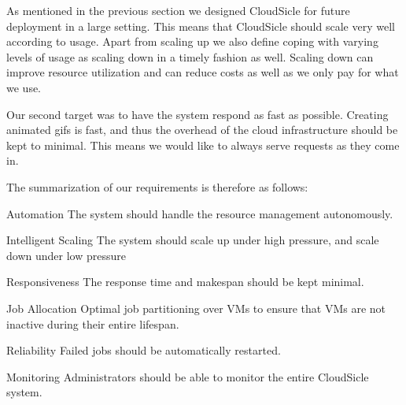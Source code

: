 \documentclass[twocolumn,twoside]{IEEEtran}
\begin{document}
As mentioned in the previous section we designed CloudSicle 
for future deployment in a large setting. This means that CloudSicle
should scale very well according to usage. Apart from scaling up
we also define coping with varying levels of usage as scaling down
in a timely fashion as well. Scaling down can improve resource utilization and can reduce costs as well as we only pay for what we use.

Our second target was to have the system respond as fast as
possible. Creating animated gifs is fast, and thus the overhead of the cloud infrastructure should be kept to minimal. This means we would like to always serve requests as they come in. 



The summarization of our requirements is therefore as follows:
\begin{LaTeXdescription}
\item[Automation] The system should handle the resource management autonomously. \hfill \
\item[Intelligent Scaling] The system should scale up under high pressure, and scale down under low pressure \hfill \
\item[Responsiveness] The response time and makespan should be kept minimal. \hfill \
\item[Job Allocation] Optimal job partitioning over VMs to ensure that VMs are not inactive during their entire lifespan.\hfill \
\item[Reliability] Failed jobs should be automatically restarted.\hfill \
\item[Monitoring] Administrators should be able to monitor the entire CloudSicle system.\hfill \
\end{LaTeXdescription}
\end{document}
